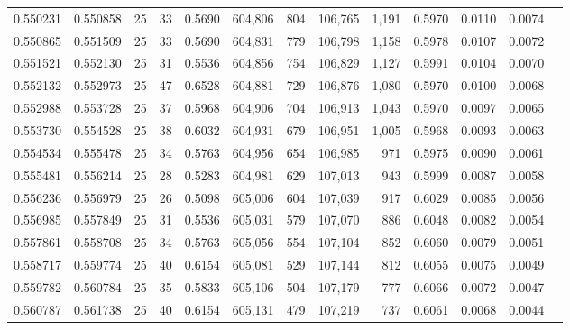 \begin{tabular}{rrrrrrrrrrrrr}
0.550231 & 0.550858 &    25 &  33 &                                     0.5690 & 604,806 &     804 & 106,765 &   1,191 & 0.5970 & 0.0110 & 0.0074 \\
0.550865 & 0.551509 &    25 &  33 &                                     0.5690 & 604,831 &     779 & 106,798 &   1,158 & 0.5978 & 0.0107 & 0.0072 \\
0.551521 & 0.552130 &    25 &  31 &                                     0.5536 & 604,856 &     754 & 106,829 &   1,127 & 0.5991 & 0.0104 & 0.0070 \\
0.552132 & 0.552973 &    25 &  47 &                                     0.6528 & 604,881 &     729 & 106,876 &   1,080 & 0.5970 & 0.0100 & 0.0068 \\
0.552988 & 0.553728 &    25 &  37 &                                     0.5968 & 604,906 &     704 & 106,913 &   1,043 & 0.5970 & 0.0097 & 0.0065 \\
0.553730 & 0.554528 &    25 &  38 &                                     0.6032 & 604,931 &     679 & 106,951 &   1,005 & 0.5968 & 0.0093 & 0.0063 \\
0.554534 & 0.555478 &    25 &  34 &                                     0.5763 & 604,956 &     654 & 106,985 &     971 & 0.5975 & 0.0090 & 0.0061 \\
0.555481 & 0.556214 &    25 &  28 &                                     0.5283 & 604,981 &     629 & 107,013 &     943 & 0.5999 & 0.0087 & 0.0058 \\
0.556236 & 0.556979 &    25 &  26 &                                     0.5098 & 605,006 &     604 & 107,039 &     917 & 0.6029 & 0.0085 & 0.0056 \\
0.556985 & 0.557849 &    25 &  31 &                                     0.5536 & 605,031 &     579 & 107,070 &     886 & 0.6048 & 0.0082 & 0.0054 \\
0.557861 & 0.558708 &    25 &  34 &                                     0.5763 & 605,056 &     554 & 107,104 &     852 & 0.6060 & 0.0079 & 0.0051 \\
0.558717 & 0.559774 &    25 &  40 &                                     0.6154 & 605,081 &     529 & 107,144 &     812 & 0.6055 & 0.0075 & 0.0049 \\
0.559782 & 0.560784 &    25 &  35 &                                     0.5833 & 605,106 &     504 & 107,179 &     777 & 0.6066 & 0.0072 & 0.0047 \\
0.560787 & 0.561738 &    25 &  40 &                                     0.6154 & 605,131 &     479 & 107,219 &     737 & 0.6061 & 0.0068 & 0.0044 \\

\end{tabular}

